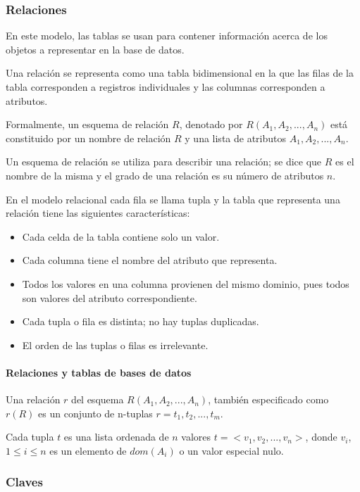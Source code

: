 \subsubsection{Relaciones}

En este modelo, las tablas se usan para contener información acerca de los objetos a representar en la base de datos.


Una relación se representa como una tabla bidimensional en la que las filas de la tabla corresponden a registros individuales y las columnas corresponden a atributos.

Formalmente, un esquema de relación $R$, denotado por $R(A_1, A_2,..., A_n)$ está constituido por un nombre de relación $R$ y una lista de atributos $A_1, A_2,..., A_n$. 


Un esquema de relación se utiliza para describir una relación; se dice que $R$ es el nombre de la misma y el grado de una relación es su número de atributos $n$.


En el modelo relacional cada fila se llama tupla y la tabla que representa una relación tiene las siguientes características:
\begin{itemize}
    \item Cada celda de la tabla contiene solo un valor.
    \item Cada columna tiene el nombre del atributo que representa.
    \item Todos los valores en una columna provienen del mismo dominio, pues todos son valores del atributo correspondiente.
    \item Cada tupla o fila es distinta; no hay tuplas duplicadas.
    \item El orden de las tuplas o filas es irrelevante.
\end{itemize}
\paragraph*{Relaciones y tablas de bases de datos}   
Una relación $r$ del esquema $R(A_1, A_2,..., A_n)$, también especificado como $r(R)$ es un conjunto de n-tuplas $r={t_1, t_2,..., t_m}$.


Cada tupla $t$ es una lista ordenada de $n$ valores $t=<v_1, v_2,...,v_n>$, donde $v_i$, $1 \leq i \leq n$ es un elemento de $dom(A_i)$ o un valor especial nulo.


\subsubsection{Claves}

